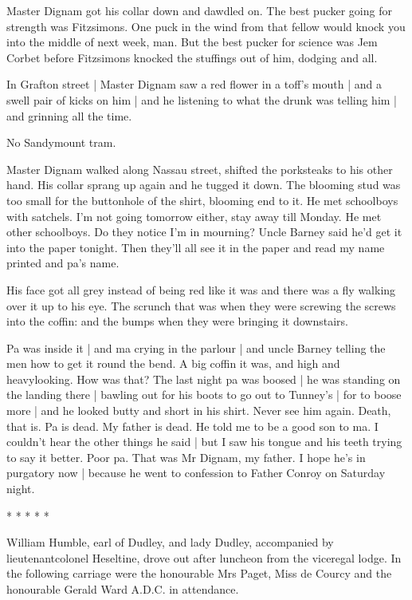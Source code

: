 Master Dignam got his collar down and dawdled on. The best pucker
going for strength was Fitzsimons. One puck in the wind from that fellow
would knock you into the middle of next week, man. But the best pucker
for science was Jem Corbet before Fitzsimons knocked the stuffings out of
him, dodging and all.

In Grafton street |
Master Dignam saw a red flower in a toff's mouth |
and a swell pair of kicks on him |
and he listening to what the drunk was telling him |
and grinning all the time.

No Sandymount tram.

Master Dignam walked along Nassau street,
shifted the porksteaks to his other hand.
His collar sprang up again and he tugged it down.
The blooming stud was too small for the buttonhole of the shirt,
blooming end to it.
He met schoolboys with satchels.
I'm not going tomorrow either,
stay away till Monday.
He met other schoolboys.
Do they notice I'm in mourning?
Uncle Barney said he'd get it into the paper tonight.
Then they'll all see it in the paper
and read my name printed and pa's name.

His face got all grey instead of being red like it was and there was a
fly walking over it up to his eye. The scrunch that was when they were
screwing the screws into the coffin: and the bumps when they were bringing
it downstairs.

Pa was inside it |
and ma crying in the parlour |
and uncle Barney telling the men how to get it round the bend.
A big coffin it was, and high and heavylooking.
How was that?
The last night pa was boosed |
he was standing on the landing there |
bawling out for his boots to go out to Tunney's |
for to boose more |
and he looked butty and short in his shirt.
Never see him again.
Death, that is.
Pa is dead.
My father is dead.
He told me to be a good son to ma.
I couldn't hear the other things he said |
but I saw his tongue and his teeth trying to say it better.
Poor pa.
That was Mr Dignam, my father.
I hope he's in purgatory now |
because he went to confession to Father Conroy on Saturday night.


    * * * * *


William Humble, earl of Dudley, and lady Dudley, accompanied by
lieutenantcolonel Heseltine, drove out after luncheon from the viceregal
lodge. In the following carriage were the honourable Mrs Paget, Miss de
Courcy and the honourable Gerald Ward A.D.C. in attendance.

